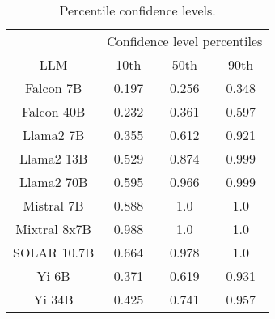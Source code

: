 \begin{table*}
\centering
\begin{tabular}{c|c|c|c}
& \multicolumn{3}{c}{Confidence level percentiles} \\ 
LLM & 10th & 50th & 90th\\ \hline
Falcon 7B & 0.197 & 0.256 & 0.348\\
Falcon 40B & 0.232 & 0.361 & 0.597\\
Llama2 7B & 0.355 & 0.612 & 0.921\\
Llama2 13B & 0.529 & 0.874 & 0.999\\
Llama2 70B & 0.595 & 0.966 & 0.999\\
Mistral 7B & 0.888 & 1.0 & 1.0\\
Mixtral 8x7B & 0.988 & 1.0 & 1.0\\
SOLAR 10.7B & 0.664 & 0.978 & 1.0\\
Yi 6B & 0.371 & 0.619 & 0.931\\
Yi 34B & 0.425 & 0.741 & 0.957\\
\hline
\end{tabular}
\caption{Percentile confidence levels.}
\label{tab:percentile_conf}
\end{table*}
